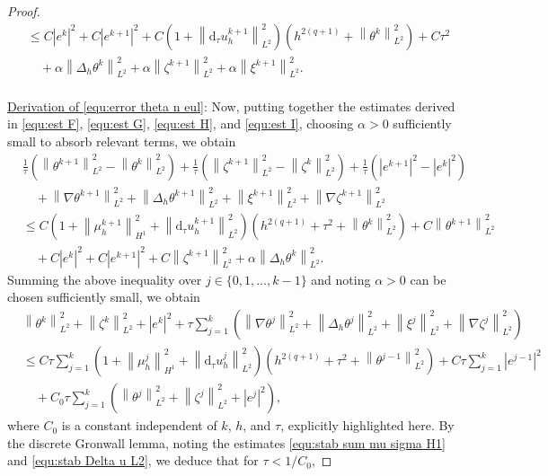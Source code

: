 \documentclass[11pt, reqno]{amsart}
\theoremstyle{definition}
\numberwithin{equation}{section}
\newcommand{\dtt}{\mathrm{d}_\tau}
\newcommand{\norm}[2]{\left\|{#1}\right\|_{#2}}
\newcommand{\abs}[1]{\left|{#1}\right|}
\begin{document}
\begin{proof}
\begin{align}
	&\leq
	C\abs{e^k}^2 + C\abs{e^{k+1}}^2 
	+
	C\left(1+\norm{\dtt u_h^{k+1}}{L^2}^2 \right) \left(h^{2(q+1)}+ \norm{\theta^k}{L^2}^2\right) 
	+
	C\tau^2
	\nonumber\\
	&\quad
	+
	\alpha \norm{\Delta_h \theta^k}{L^2}^2
	+
	\alpha \norm{\zeta^{k+1}}{L^2}^2
	+
	\alpha \norm{\xi^{k+1}}{L^2}^2.
\end{align}
\\
\underline{{Derivation of \eqref{equ:error theta n eul}}}: Now, putting together the estimates derived in \eqref{equ:est F}, \eqref{equ:est G}, \eqref{equ:est H}, and \eqref{equ:est I}, choosing $\alpha>0$ sufficiently small to absorb relevant terms, we obtain
\begin{align*}
	&\frac{1}{\tau} \left(\norm{\theta^{k+1}}{L^2}^2 - \norm{\theta^k}{L^2}^2 \right)
	+
	\frac{1}{\tau} \left(\norm{\zeta^{k+1}}{L^2}^2 - \norm{\zeta^k}{L^2}^2 \right)
	+
	\frac{1}{\tau} \left(\abs{e^{k+1}}^2 - \abs{e^k}^2 \right) 
	\\
	&\quad
	+
	\norm{\nabla \theta^{k+1}}{L^2}^2
	+
	\norm{\Delta_h \theta^{k+1}}{L^2}^2
	+
	\norm{\xi^{k+1}}{L^2}^2
	+
	\norm{\nabla \zeta^{k+1}}{L^2}^2
	\\
	&\leq
	C\left(1+\norm{\mu_h^{k+1}}{H^1}^2 +\norm{\dtt u_h^{k+1}}{L^2}^2 \right) \left(h^{2(q+1)}+ \tau^2+ \norm{\theta^k}{L^2}^2 \right)
	+
	C \norm{\theta^{k+1}}{L^2}^2
	\nonumber\\
	&\quad
	+ 
	C\abs{e^k}^2 + C\abs{e^{k+1}}^2 + C\norm{\zeta^{k+1}}{L^2}^2 + \alpha \norm{\Delta_h \theta^k}{L^2}^2.
\end{align*}
Summing the above inequality over $j\in \{0,1,\ldots,k-1\}$ and noting $\alpha>0$ can be chosen sufficiently small, we obtain
\begin{align*}
	&\norm{\theta^k}{L^2}^2
	+
	\norm{\zeta^k}{L^2}^2
	+
	\abs{e^k}^2
	+
	\tau \sum_{j=1}^k \left(\norm{\nabla \theta^j}{L^2}^2
	+
	\norm{\Delta_h \theta^j}{L^2}^2
	+
	\norm{\xi^j}{L^2}^2
	+
	\norm{\nabla \zeta^j}{L^2}^2 \right)
	\\
	&\leq
	C\tau \sum_{j=1}^k \left(1+\norm{\mu_h^j}{H^1}^2 +\norm{\dtt u_h^j}{L^2}^2 \right) \left(h^{2(q+1)}+ \tau^2+ \norm{\theta^{j-1}}{L^2}^2 \right)
	+
	C\tau \sum_{j=1}^k \abs{e^{j-1}}^2
	\\
	&\quad
	+
	C_0 \tau \sum_{j=1}^k \left(\norm{\theta^j}{L^2}^2 + \norm{\zeta^j}{L^2}^2 + \abs{e^j}^2 \right),
\end{align*}
where $C_0$ is a constant independent of $k$, $h$, and $\tau$, explicitly highlighted here.
By the discrete Gronwall lemma, noting the estimates \eqref{equ:stab sum mu sigma H1} and \eqref{equ:stab Delta u L2}, we deduce that for $\tau<1/C_0$,

\end{proof}
\end{document}
